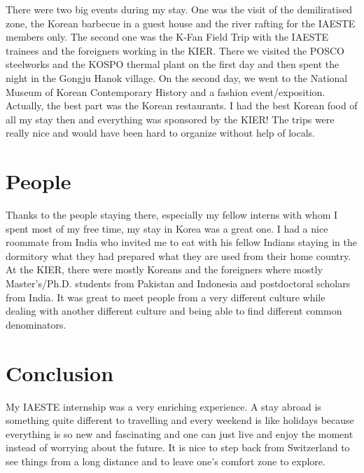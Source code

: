 There were two big events during my stay. One was the visit of the demiliratised zone, the Korean barbecue in a guest house and the river rafting for the IAESTE members only. The second one was the K-Fan Field Trip with the IAESTE trainees and the foreigners working in the KIER. There we visited the POSCO steelworks and the KOSPO thermal plant on the first day and then spent the night in the Gongju Hanok village. On the second day, we went to the National Museum of Korean Contemporary History and a fashion event/exposition. Actually, the best part was the Korean restaurants. I had the best Korean food of all my stay then and everything was sponsored by the KIER! The trips were really nice and would have been hard to organize without help of locals.
\section*{People}
Thanks to the people staying there, especially my fellow interns with whom I spent most of my free time, my stay in Korea was a great one. I had a nice roommate from India who invited me to eat with his fellow Indians staying in the dormitory what they had prepared what they are used from their home country. At the KIER, there were mostly Koreans and the foreigners where mostly Master's/Ph.D. students from Pakistan and Indonesia and postdoctoral scholars from India. It was great to meet people from a very different culture while dealing with another different culture and being able to find different common denominators. 
\section*{Conclusion}
My IAESTE internship was a very enriching experience. A stay abroad is something quite different to travelling and every weekend is like holidays because everything is so new and fascinating and one can just live and enjoy the moment instead of worrying about the future. It is nice to step back from Switzerland to see things from a long distance and to leave one's comfort zone to explore.
\appendix
\onecolumn

